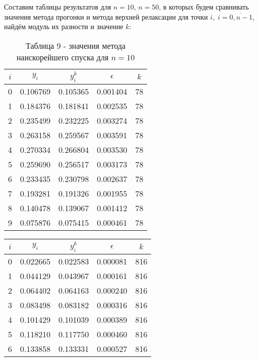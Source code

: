 \documentclass[a4paper,12pt]{article}
\begin{document}
{		Составим таблицы результатов для $n = 10$, $n = 50$,
		в которых будем сравнивать значения метода прогонки и метода верхней релаксации для точки $i,\; i = \overline{0, n-1}$,
		найдём модуль их разности и значение $k$:
		\begin{table}[h]
			\centering
			\begin{tabular}{|c|c|c|c|c|}
				\hline
				$i$ & $y_i$ & $y_i^{k}$ & $\epsilon$ & $k$ \\
				\hline
				0 & 0.106769 & 0.105365 & 0.001404 & 78 \\
				\hline
				1 & 0.184376 & 0.181841 & 0.002535 & 78 \\
				\hline
				2 & 0.235499 & 0.232225 & 0.003274 & 78 \\
				\hline
				3 & 0.263158 & 0.259567 & 0.003591 & 78 \\
				\hline
				4 & 0.270334 & 0.266804 & 0.003530 & 78 \\
				\hline
				5 & 0.259690 & 0.256517 & 0.003173 & 78 \\
				\hline
				6 & 0.233435 & 0.230798 & 0.002637 & 78 \\
				\hline
				7 & 0.193281 & 0.191326 & 0.001955 & 78 \\
				\hline
				8 & 0.140478 & 0.139067 & 0.001412 & 78 \\
				\hline
				9 & 0.075876 & 0.075415 & 0.000461 & 78 \\
				\hline
			\end{tabular}
			\caption*{\small{Таблица 9 - значения метода наискорейшего спуска для $n = 10$}}
		\end{table}
		\begin{table}[h]
			\centering
			\begin{tabular}{|c|c|c|c|c|}
				\hline
				$i$ & $y_i$ & $y_i^{k}$ & $\epsilon$ & $k$ \\
				\hline
				0 & 0.022665 & 0.022583 & 0.000081 & 816 \\
				\hline
				1 & 0.044129 & 0.043967 & 0.000161 & 816 \\
				\hline
				2 & 0.064402 & 0.064163 & 0.000240 & 816 \\
				\hline
				3 & 0.083498 & 0.083182 & 0.000316 & 816 \\
				\hline
				4 & 0.101429 & 0.101039 & 0.000389 & 816 \\
				\hline
				5 & 0.118210 & 0.117750 & 0.000460 & 816 \\
				\hline
				6 & 0.133858 & 0.133331 & 0.000527 & 816 \\
				\hline

\end{tabular}
\end{table}}
\end{document}
